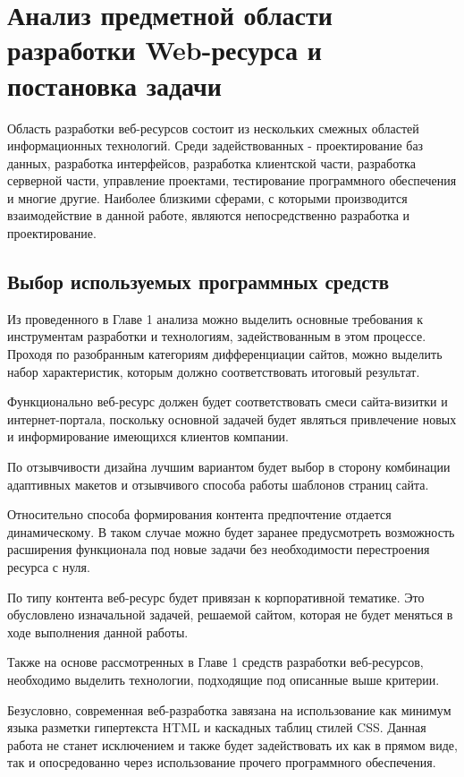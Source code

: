 \section{Анализ предметной области разработки Web-ресурса и постановка задачи}

Область разработки веб-ресурсов состоит из нескольких смежных областей информационных технологий.
Среди задействованных - проектирование баз данных, разработка интерфейсов, разработка клиентской части, разработка серверной части, управление проектами, тестирование программного обеспечения и многие другие.
Наиболее близкими сферами, с которыми производится взаимодействие в данной работе, являются непосредственно разработка и проектирование.

\subsection{Выбор используемых программных средств}

Из проведенного в Главе 1 анализа можно выделить основные требования к инструментам разработки и технологиям, задействованным в этом процессе.
Проходя по разобранным категориям дифференциации сайтов, можно выделить набор характеристик, которым должно соответствовать итоговый результат.

Функционально веб-ресурс должен будет соответствовать смеси сайта-визитки и интернет-портала, поскольку основной задачей будет являться привлечение новых и информирование имеющихся клиентов компании.

По отзывчивости дизайна лучшим вариантом будет выбор в сторону комбинации адаптивных макетов и отзывчивого способа работы шаблонов страниц сайта.

Относительно способа формирования контента предпочтение отдается динамическому.
В таком случае можно будет заранее предусмотреть возможность расширения функционала под новые задачи без необходимости перестроения ресурса с нуля.

По типу контента веб-ресурс будет привязан к корпоративной тематике.
Это обусловлено изначальной задачей, решаемой сайтом, которая не будет меняться в ходе выполнения данной работы.

Также на основе рассмотренных в Главе 1 средств разработки веб-ресурсов, необходимо выделить технологии, подходящие под описанные выше критерии.

Безусловно, современная веб-разработка завязана на использование как минимум языка разметки гипертекста HTML и каскадных таблиц стилей CSS.
Данная работа не станет исключением и также будет задействовать их как в прямом виде, так и опосредованно через использование прочего программного обеспечения.

